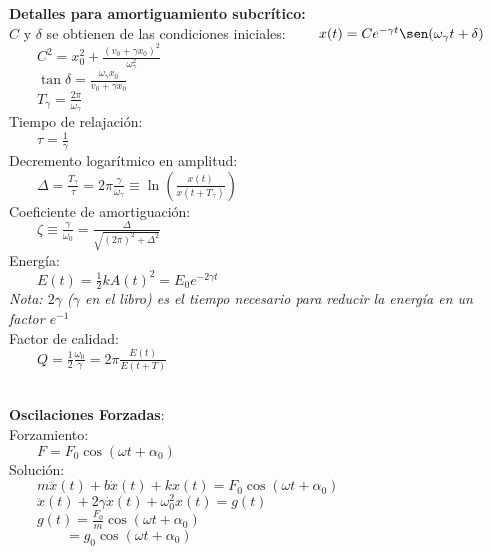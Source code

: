 \documentclass[a4paper,landscape,10pt]{cheatsheet}
\begin{document}
\textbf{Detalles para amortiguamiento subcrítico:}\\
$C$ y $\delta$ se obtienen de las condiciones iniciales:
$\qquad x(t)=Ce^{-\gamma t}\sen(\omega_\gamma t+\delta)$\\
$\qquad C^2=x_0^2+\frac{\left(v_0+\gamma x_0\right)^2}{\omega_\gamma^2}$\\
$\qquad \tan\delta=\frac{\omega_\gamma x_0}{v_0+\gamma x_0}$\\
$\qquad T_\gamma=\frac{2\pi}{\omega_\gamma}$\\
Tiempo de relajación:\\
$\qquad\tau=\frac{1}{\gamma}$\\
Decremento logarítmico en amplitud:\\
$\qquad\Delta=\frac{T_\gamma}{\tau}=2\pi\frac{\gamma}{\omega_\gamma}\equiv\ln{\left(\frac{x(t)}{x(t+T_\gamma)}\right)}$\\
Coeficiente de amortiguación: \\
$\qquad\zeta\equiv\frac{\gamma}{\omega_0}=\frac{\Delta}{\sqrt{(2\pi)^2+\Delta^2}} $\\
Energía:\\
$\qquad E(t)=\frac{1}{2}kA(t)^2=E_0e^{-2\gamma t}$\\
\textit{Nota: $2\gamma$ ($\gamma$ en el libro) es el tiempo necesario para reducir la energía en un factor $e^{-1}$}\\
Factor de calidad: \\
$\qquad Q=\frac{1}{2}\frac{\omega_0}{\gamma}=2\pi\frac{E(t)}{E(t+T)}$

\hfill\\
\textbf{Oscilaciones Forzadas}:\\
Forzamiento: \\
$\qquad F=F_0\cos\left(\omega t+\alpha_0\right)$\\
Solución:\\
$\qquad m\ddot{x}(t)+b\dot{x}(t)+kx(t) = F_0\cos\left(\omega t+\alpha_0\right)$\\
$\qquad\ddot{x}(t)+2\gamma\dot{x}(t)+\omega_0^2x(t)=g(t)$\\
$\qquad g(t)=\frac{F_0}{m}\cos\left(\omega t+\alpha_0\right)$\\
$\qquad\qquad=g_0\cos\left(\omega t+\alpha_0\right)$\\
\end{document}
